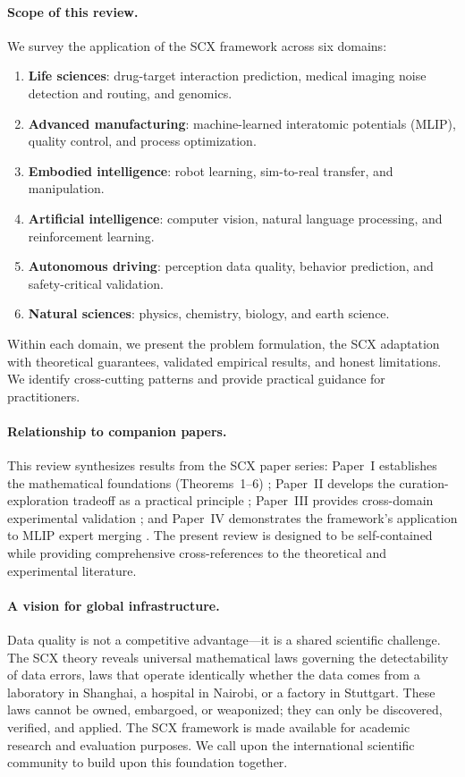 \documentclass[twocolumn]{article}
\theoremstyle{definition}
\begin{document}
\paragraph{Scope of this review.}
We survey the application of the SCX framework across six domains:
\begin{enumerate}[nosep,leftmargin=*,itemsep=1pt]
  \item \textbf{Life sciences}: drug-target interaction prediction, medical imaging noise detection and routing, and genomics.
  \item \textbf{Advanced manufacturing}: machine-learned interatomic potentials (MLIP), quality control, and process optimization.
  \item \textbf{Embodied intelligence}: robot learning, sim-to-real transfer, and manipulation.
  \item \textbf{Artificial intelligence}: computer vision, natural language processing, and reinforcement learning.
  \item \textbf{Autonomous driving}: perception data quality, behavior prediction, and safety-critical validation.
  \item \textbf{Natural sciences}: physics, chemistry, biology, and earth science.
\end{enumerate}
Within each domain, we present the problem formulation, the SCX adaptation with theoretical guarantees, validated empirical results, and honest limitations. We identify cross-cutting patterns and provide practical guidance for practitioners.

\paragraph{Relationship to companion papers.}
This review synthesizes results from the SCX paper series: Paper~I establishes the mathematical foundations (Theorems~1--6) \cite{paperI}; Paper~II develops the curation-exploration tradeoff as a practical principle \cite{paperII}; Paper~III provides cross-domain experimental validation \cite{paperIII}; and Paper~IV demonstrates the framework's application to MLIP expert merging \cite{paperIV}. The present review is designed to be self-contained while providing comprehensive cross-references to the theoretical and experimental literature.

\paragraph{A vision for global infrastructure.}
Data quality is not a competitive advantage---it is a shared scientific challenge. The SCX theory reveals universal mathematical laws governing the detectability of data errors, laws that operate identically whether the data comes from a laboratory in Shanghai, a hospital in Nairobi, or a factory in Stuttgart. These laws cannot be owned, embargoed, or weaponized; they can only be discovered, verified, and applied. The SCX framework is made available for academic research and evaluation purposes. We call upon the international scientific community to build upon this foundation together.
\end{document}
